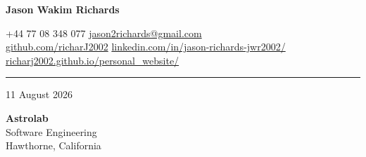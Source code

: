 \documentclass[10pt,a4paper]{article}
\newcommand{\NameSize}{20pt}
\newcommand{\ContactSize}{8pt}
\newcommand{\MetaSize}{8.8pt}
\newcommand{\NameLineSize}{20pt}
\newcommand{\KeywordLineSize}{9pt}
\newcommand{\ContactLineSize}{8pt}
\newcommand{\MetaLineSize}{10.5pt}
\newcommand{\HeaderContactToLine}{2pt}
\newcommand{\HeaderLineToDate}{8pt}
\newcommand{\DateAfter}{22pt}             %
\newcommand{\HeaderLineThickness}{0.5pt}
\begin{document}

\begin{center}



    {
        \fontsize{\NameSize}{\NameLineSize}\selectfont
        \textbf{\textcolor{CVBlack}{Jason Wakim Richards}}
    }


    \vspace{\KeywordLineSize}

    {
        \fontsize{\ContactSize}{\ContactLineSize}
        \selectfont
        \textcolor{CVBlack}
        {
            +44 77 08 348 077
            \quad\textbar\quad
            \href{mailto:jason2richards@gmail.com}{jason2richards@gmail.com}
            \\
            \href{https://github.com/richarJ2002}{github.com/richarJ2002}
            \quad\textbar\quad
            \href{https://www.linkedin.com/in/jason-richards-jwr2002/}
            {linkedin.com/in/jason-richards-jwr2002/}
            \quad\textbar\quad
            \href{https://richarj2002.github.io/personal_website/}{richarj2002.github.io/personal\_website/}
        }
    }

\end{center}

\vspace{\HeaderContactToLine}
\noindent\textcolor{CVBlack}{\rule{\textwidth}{\HeaderLineThickness}}


\vspace{\HeaderLineToDate}

{\fontsize{\MetaSize}{\MetaLineSize}\selectfont
    \textcolor{CVGray}{11 August 2026}}

\vspace{\DateAfter}

{\fontsize{\MetaSize}{\MetaLineSize}\selectfont
    \textbf{\textcolor{CVBlack}{Astrolab}}\\
    \textcolor{CVDarkGray}{Software Engineering}\\
    \textcolor{CVDarkGray}{Hawthorne, California}}
\end{document}

